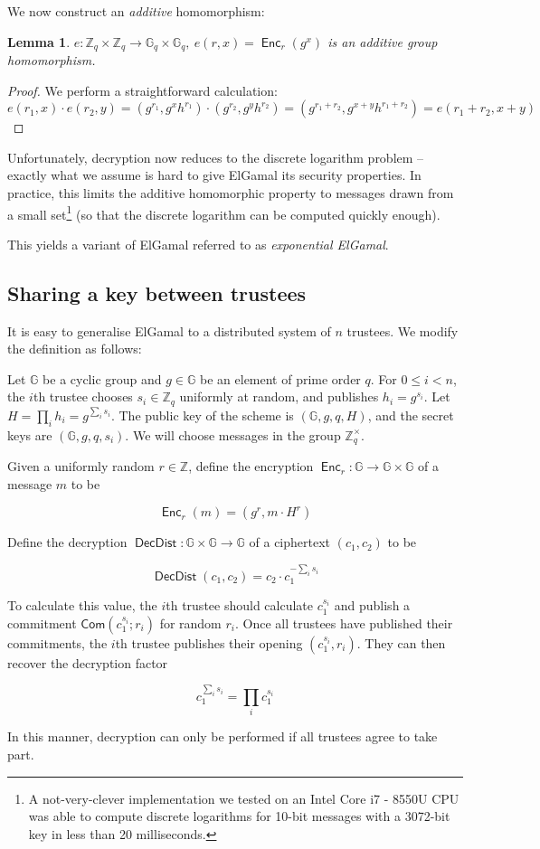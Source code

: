 \documentclass[11pt,twoside,a4paper]{article}
\DeclareMathOperator{\Enc}{\mathsf{Enc}}
\DeclareMathOperator{\DecDist}{\mathsf{DecDist}}
\newcommand{\commit}{\mathsf{Com}}
\newtheorem{lemma}[theorem]{Lemma}
\theoremstyle{definition}
\begin{document}
We now construct an \textit{additive} homomorphism:
\begin{lemma}
    $e:\mathbb{Z}_q\times\mathbb{Z}_q\rightarrow\mathbb{G}_q\times\mathbb{G}_q,\ e(r, x)=\Enc_r(g^x)$ is an additive group homomorphism.
\end{lemma}
\begin{proof}
    We perform a straightforward calculation:
    $$e(r_1, x)\cdot e(r_2,y)=(g^{r_1},g^xh^{r_1})\cdot(g^{r_2},g^yh^{r_2})=(g^{r_1+r_2},g^{x+y}h^{r_1+r_2})=e(r_1+r_2, x+y)$$
\end{proof}
Unfortunately, decryption now reduces to the discrete logarithm problem -- exactly what we assume is hard to give ElGamal its security properties. In practice, this limits the additive homomorphic property to messages drawn from a small set\footnote{A not-very-clever implementation we tested on an Intel Core i7 - 8550U CPU was able to compute discrete logarithms for 10-bit messages with a 3072-bit key in less than 20 milliseconds.} (so that the discrete logarithm can be computed quickly enough).

This yields a variant of ElGamal referred to as \textit{exponential ElGamal}.
\subsection{Sharing a key between trustees}
It is easy to generalise ElGamal to a distributed system of $n$ trustees. We modify the definition as follows:
\begin{definition}
    Let $\mathbb{G}$ be a cyclic group and $g\in\mathbb{G}$ be an element of prime order $q$. For $0\leq i<n$, the $i$th trustee chooses $s_i\in\mathbb{Z}_q$ uniformly at random, and publishes $h_i=g^{s_i}$. Let $H=\prod_i h_i=g^{\sum_i s_i}$. The public key of the scheme is $(\mathbb{G}, g, q, H)$, and the secret keys are $(\mathbb{G}, g, q, s_i)$. We will choose messages in the group $\mathbb{Z}^\times_q$.

    Given a uniformly random $r\in\mathbb{Z}$, define the encryption $\Enc_r:\mathbb{G}\rightarrow\mathbb{G}\times\mathbb{G}$ of a message $m$ to be
    
    $$\Enc_r(m) = (g^r, m\cdot H^r)$$

    Define the decryption $\DecDist:\mathbb{G}\times\mathbb{G}\rightarrow \mathbb{G}$ of a ciphertext $(c_1, c_2)$ to be
    
    $$\DecDist(c_1,c_2)=c_2\cdot c_1^{-\sum_i s_i}$$
    
    To calculate this value, the $i$th trustee should calculate $c_1^{s_i}$ and publish a commitment $\commit\left(c_1^{s_i};r_i\right)$ for random $r_i$. Once all trustees have published their commitments, the $i$th trustee publishes their opening $\left(c_1^{s_i}, r_i\right)$. They can then recover the decryption factor
    
    $$c_1^{\sum_i s_i}=\prod_i{c_1^{s_i}}$$
\end{definition}
In this manner, decryption can only be performed if all trustees agree to take part.
\end{document}
